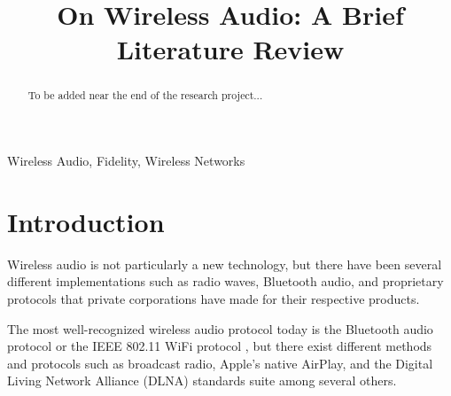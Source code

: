 \documentclass[conference]{IEEEtran}
\begin{document}
\title{On Wireless Audio: A Brief Literature Review}

\author{
    \and
    \and
}

\maketitle


\begin{abstract}
    To be added near the end of the research project...
\end{abstract}

\begin{IEEEkeywords}
    Wireless Audio, Fidelity, Wireless Networks
\end{IEEEkeywords}

\section*{Introduction}
Wireless audio is not particularly a new technology, but there have been several different
implementations such as radio waves, Bluetooth audio, and proprietary protocols that
private corporations have made for their respective products.\cite{bhalla_unraveling_2021}

The most well-recognized wireless audio protocol today is the Bluetooth audio protocol
or the IEEE 802.11 WiFi protocol , but there exist different methods and protocols
such as broadcast radio, Apple's native AirPlay, and the Digital Living Network
Alliance (DLNA) standards suite among several others.\cite{parks_wireless_2013}
\end{document}
